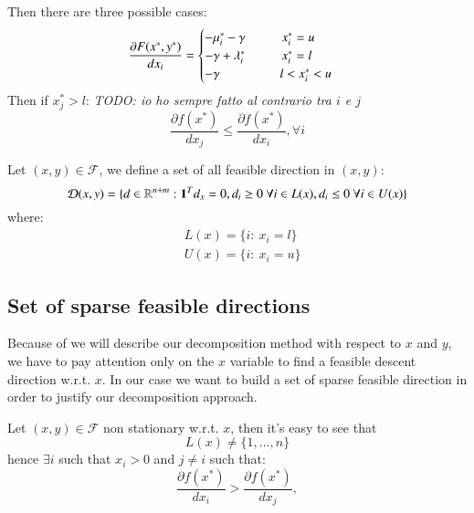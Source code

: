 Then there are three possible cases:
\begin{equation}
 \frac{\partial F(x^*,y^*)}{dx_i} = \begin{cases} -\mu_i^* -\gamma \hspace{1cm} x^*_i =u \\
 -\gamma+\lambda^*_i \hspace{1cm} x^*_i =l \\
 -\gamma \hspace{1.65cm} l<x^*_i <u 
\end{cases}
\end{equation}
Then if $x^*_j>l$: \textit{TODO: io ho sempre fatto al contrario tra $i$ e $j$}
\begin{equation}
 \frac{\partial f(x^*)}{dx_j} \le \frac{\partial f(x^*)}{dx_i}, \forall i
\end{equation}

Let $(x,y) \in \mathcal{F}$, we define a set of all feasible direction in $(x,y)$:
\begin{equation}
 \mathcal{D}(x,y)=\{ d \in \mathbb{R}^{n+m}: \mathbf{1}^Td_x=0, d_i\ge 0 \ \forall i \in L(x), d_i\le 0 \ \forall i \in U(x)\}
\end{equation}
where:
\begin{equation}
 \begin{aligned}
  &L(x)=\{ i: \ x_i=l\}\\
  &U(x)=\{ i: \ x_i=u\}
 \end{aligned}
\end{equation}



\subsection{Set of sparse feasible directions}
Because of we will describe our decomposition method with respect to $x$ and $y$, we have to pay attention only on the $x$ variable to find a feasible descent direction w.r.t. $x$. 
In our case we want to build a set of sparse feasible direction in order to justify our decomposition approach.

Let $(x,y) \in \mathcal{F}$ non stationary w.r.t. $x$, then it's easy to see that
\begin{equation}
 L(x)\ne \{1,\ldots,n\}
\end{equation}
hence $\exists i$ such that $x_i>0$ and $j \ne i$ such that:
\begin{equation}
 \frac{\partial f(x^*)}{dx_i} > \frac{\partial f(x^*)}{dx_j}, 
\end{equation}

